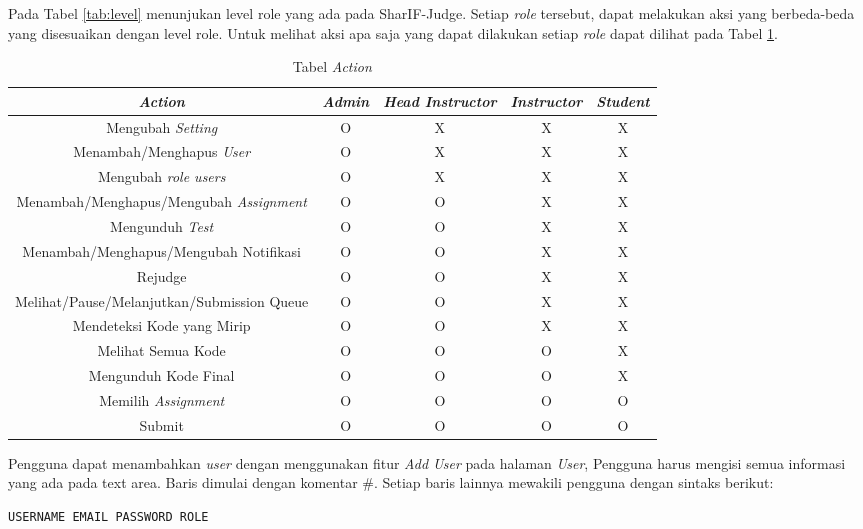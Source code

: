 \begin{itemize}
        Pada Tabel \ref{tab:level} menunjukan level role yang ada pada SharIF-Judge. Setiap \textit{role} tersebut, dapat melakukan aksi yang berbeda-beda yang disesuaikan dengan level role. Untuk melihat aksi apa saja yang dapat dilakukan setiap \textit{role} dapat dilihat pada Tabel \ref{tab:aksi}.
    \begin{table}[H]
	    \centering 
	    \caption{Tabel \textit{Action}}
	    \label{tab:aksi}
	    \begin{tabular}{|c|c|c|c|c|}
		    \hline
		    \textit{Action} & \textit{Admin} & \textit{Head Instructor} & \textit{Instructor} & \textit{Student} \\
		    \hline
		    Mengubah \textit{Setting} & O & X & X & X \\
		    \hline
		    Menambah/Menghapus \textit{User} & O & X & X & X \\
		    \hline
		    Mengubah \textit{role users} & O & X & X & X \\
		    \hline
		    Menambah/Menghapus/Mengubah \textit{Assignment} & O & O & X & X \\
		    \hline
		    Mengunduh \textit{Test} & O & O & X & X \\
		    \hline
		    Menambah/Menghapus/Mengubah Notifikasi & O & O & X & X \\
		    \hline
		    Rejudge & O & O & X & X \\
		    \hline
		    Melihat/Pause/Melanjutkan/Submission Queue & O & O & X & X \\
		    \hline
		    Mendeteksi Kode yang Mirip  & O & O & X & X \\
		    \hline
		    Melihat Semua Kode  & O & O & O & X \\
		    \hline
		    Mengunduh Kode Final  & O & O & O & X \\
		    \hline
		    Memilih \textit{Assignment}   & O & O & O & O \\
		    \hline
		    Submit  & O & O & O & O \\
		    \hline
	    \end{tabular} 
    \end{table}
        Pengguna dapat menambahkan \textit{user} dengan menggunakan fitur \textit{Add User} pada halaman \textit{User}, Pengguna harus mengisi semua informasi yang ada pada text area. Baris dimulai dengan komentar
\#. Setiap baris lainnya mewakili pengguna dengan sintaks berikut:
\hspace{-10mm}

    \begin{verbatim}
USERNAME EMAIL PASSWORD ROLE
        

\end{verbatim}
\end{itemize}
